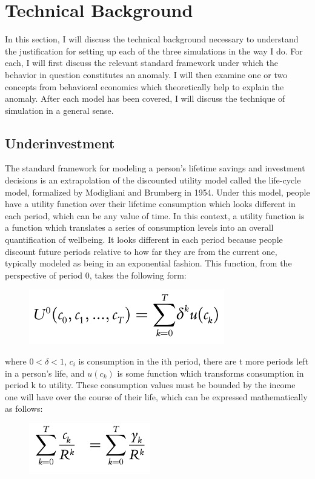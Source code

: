 \documentclass[10pt,twocolumn]{article}
\begin{document}
\section{Technical Background}
In this section, I will discuss the technical background necessary to understand the justification for setting up each of the three simulations in the way I do. For each, I will first discuss the relevant standard framework under which the behavior in question constitutes an anomaly. I will then examine one or two concepts from behavioral economics which theoretically help to explain the anomaly. After each model has been covered, I will discuss the technique of simulation in a general sense.  

\subsection{Underinvestment}
The standard framework for modeling a person’s lifetime savings and investment decisions is an extrapolation of the discounted utility model called the life-cycle model, formalized by Modigliani and Brumberg in 1954.\cite{modigliani} Under this model, people have a utility function over their lifetime consumption which looks different in each period, which can be any value of time. In this context, a utility function is a function which translates a series of consumption levels into an overall quantification of wellbeing. It looks different in each period because people discount future periods relative to how far they are from the current one, typically modeled as being in an exponential fashion. This function, from the perspective of period 0, takes the following form:
\begin{figure}[h]
    \centering
    \includegraphics[width=0.8\linewidth]{Underinvestment1.png}
\end{figure}

\noindent where $0 < \delta < 1$, $c_i$ is consumption in the ith period, there are t more periods left in a person's life, and $u(c_k)$ is some function which transforms consumption in period k to utility. These consumption values must be bounded by the income one will have over the course of their life, which can be expressed mathematically as follows:
\begin{figure}[h]
    \centering
    \includegraphics[width=0.5\linewidth]{underinvestment2.png}
\end{figure}
\end{document}
